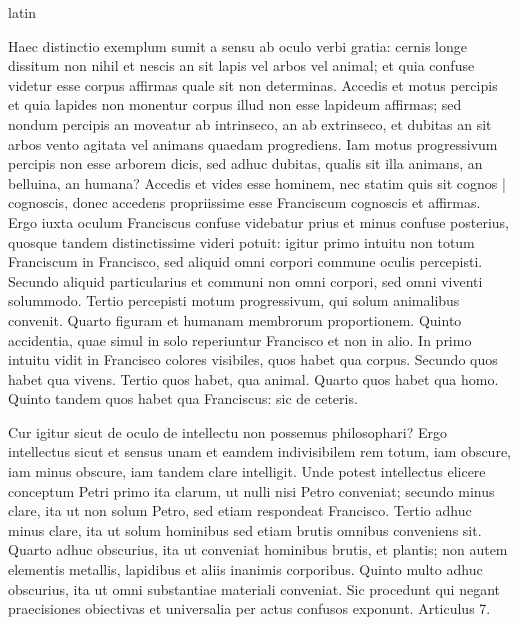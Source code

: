 \begin{otherlanguage*}{latin}
\pstart
{}
\pend

\pstart
Haec distinctio exemplum sumit a sensu ab oculo verbi gratia:
cernis longe dissitum non nihil et nescis an sit lapis vel arbos vel animal; et quia confuse videtur esse corpus affirmas quale sit non determinas. Accedis et motus percipis et quia lapides non monentur corpus illud non esse lapideum affirmas; sed nondum percipis an moveatur ab intrinseco, an ab extrinseco, et dubitas an sit arbos vento agitata vel animans quaedam progrediens. Iam motus progressivum percipis non esse arborem dicis, sed adhuc dubitas, qualis sit illa animans, an belluina, an humana? Accedis et vides esse hominem, nec statim quis sit cognos \textnormal{|} cognoscis, donec accedens propriissime esse Franciscum cognoscis et affirmas. Ergo iuxta oculum Franciscus confuse videbatur prius et minus confuse posterius, quosque tandem distinctissime videri potuit:
igitur primo intuitu non totum Franciscum in Francisco, sed aliquid omni corpori commune oculis percepisti. Secundo aliquid particularius et communi non omni corpori, sed omni viventi solummodo. Tertio percepisti motum progressivum, qui solum animalibus convenit. Quarto figuram et humanam membrorum proportionem. Quinto accidentia, quae simul in solo reperiuntur Francisco et non in alio. In primo intuitu vidit in Francisco colores visibiles, quos habet qua corpus. Secundo quos habet qua vivens. Tertio quos habet, qua animal. Quarto quos habet qua homo. Quinto tandem quos habet qua Franciscus:
sic de ceteris. 
\pend

\pstart
Cur igitur sicut de oculo de intellectu non possemus philosophari? Ergo intellectus sicut et sensus unam et eamdem indivisibilem rem totum, iam obscure, iam minus obscure, iam tandem clare intelligit. Unde potest intellectus elicere conceptum Petri primo ita clarum, ut nulli nisi Petro conveniat; secundo minus clare, ita ut non solum Petro, sed etiam respondeat Francisco. Tertio adhuc minus clare, ita ut solum hominibus sed etiam brutis omnibus conveniens sit. Quarto adhuc obscurius, ita ut conveniat hominibus brutis, et plantis; non autem elementis metallis, lapidibus et aliis inanimis corporibus. Quinto multo adhuc obscurius, ita ut omni substantiae materiali conveniat. Sic procedunt qui negant praecisiones obiectivas et universalia per actus confusos exponunt. Articulus 7. 
\pend

\pstart
{}
\pend


\end{otherlanguage*}
